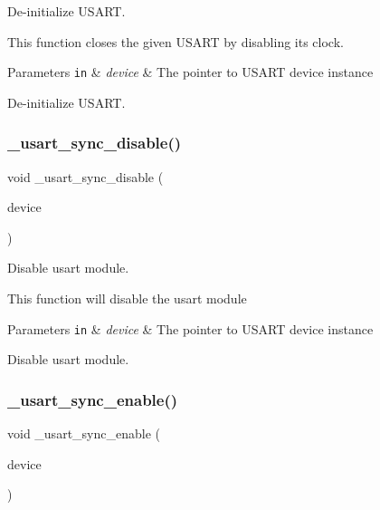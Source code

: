 De-\/initialize U\+S\+A\+RT. 

This function closes the given U\+S\+A\+RT by disabling its clock.


\begin{DoxyParams}[1]{Parameters}
\mbox{\tt in}  & {\em device} & The pointer to U\+S\+A\+RT device instance\\
\hline
\end{DoxyParams}
De-\/initialize U\+S\+A\+RT. \mbox{\label{group___h_p_l_gac021f29c77d8a9bfabfdd7433dbbb024}} 
\subsubsection{\texorpdfstring{\+\_\+usart\+\_\+sync\+\_\+disable()}{\_usart\_sync\_disable()}}
{\footnotesize\ttfamily void \+\_\+usart\+\_\+sync\+\_\+disable (\begin{DoxyParamCaption}\item[{struct \hyperlink{struct__usart__sync__device}{\+\_\+usart\+\_\+sync\+\_\+device} $\ast$const}]{device }\end{DoxyParamCaption})}



Disable usart module. 

This function will disable the usart module


\begin{DoxyParams}[1]{Parameters}
\mbox{\tt in}  & {\em device} & The pointer to U\+S\+A\+RT device instance\\
\hline
\end{DoxyParams}
Disable usart module. \mbox{\label{group___h_p_l_ga5ca07057bde212b46f6547e5bdb876de}} 
\subsubsection{\texorpdfstring{\+\_\+usart\+\_\+sync\+\_\+enable()}{\_usart\_sync\_enable()}}
{\footnotesize\ttfamily void \+\_\+usart\+\_\+sync\+\_\+enable (\begin{DoxyParamCaption}\item[{struct \hyperlink{struct__usart__sync__device}{\+\_\+usart\+\_\+sync\+\_\+device} $\ast$const}]{device }\end{DoxyParamCaption})}



